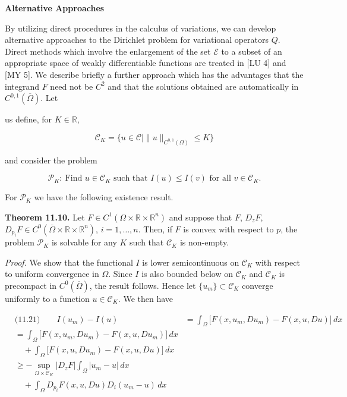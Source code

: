 \medskip

\noindent\textbf{Alternative Approaches}

By utilizing direct procedures in the calculus of variations, we can develop alternative approaches to the Dirichlet problem for variational operators $Q$. Direct methods which involve the enlargement of the set $\mathcal{E}$ to a subset of an appropriate space of weakly differentiable functions are treated in [LU 4] and [MY 5]. We describe briefly a further approach which has the advantages that the integrand $F$ need not be $C^2$ and that the solutions obtained are automatically in $C^{0,1}(\overline{\Omega})$. Let



us define, for $K\in\mathbb{R}$,

\[
\mathcal{C}_K=\{u\in \mathcal{C}\mid \|u\|_{C^{0,1}(\Omega)}\le K\}
\]

and consider the problem

\[
\mathscr{P}_K:\ \text{Find }u\in \mathcal{C}_K\text{ such that }I(u)\le I(v)\text{ for all }v\in \mathcal{C}_K.
\]

For $\mathscr{P}_K$ we have the following existence result.

\medskip

\noindent\textbf{Theorem 11.10.} Let $F\in C^1(\Omega\times \mathbb{R}\times \mathbb{R}^n)$ and suppose that $F$, $D_zF$, $D_{p_i}F\in C^0(\overline{\Omega}\times \mathbb{R}\times \mathbb{R}^n)$, $i=1,\ldots,n$. Then, if $F$ is convex with respect to $p$, the problem $\mathscr{P}_K$ is solvable for any $K$ such that $\mathcal{C}_K$ is non-empty.

\bigskip

\noindent\textit{Proof.} We show that the functional $I$ is lower semicontinuous on $\mathcal{C}_K$ with respect to uniform convergence in $\Omega$. Since $I$ is also bounded below on $\mathcal{C}_K$ and $\mathcal{C}_K$ is precompact in $C^0(\overline{\Omega})$, the result follows. Hence let $\{u_m\}\subset \mathcal{C}_K$ converge uniformly to a function $u\in \mathcal{C}_K$. We then have

\begin{equation*}
\begin{aligned}
&\text{(11.21)}\qquad I(u_m)-I(u)
&= \int_{\Omega}\bigl[F(x,u_m,Du_m)-F(x,u,Du)\bigr]\,dx \\
&= \int_{\Omega}\bigl[F(x,u_m,Du_m)-F(x,u,Du_m)\bigr]\,dx \\
&\quad + \int_{\Omega}\bigl[F(x,u,Du_m)-F(x,u,Du)\bigr]\,dx \\
&\ge -\sup_{\Omega\times \mathcal{C}_K}|D_zF|\int_{\Omega}|u_m-u|\,dx \\
&\quad + \int_{\Omega} D_{p_i}F(x,u,Du)D_i(u_m-u)\,dx
\end{aligned}
\end{equation*}

